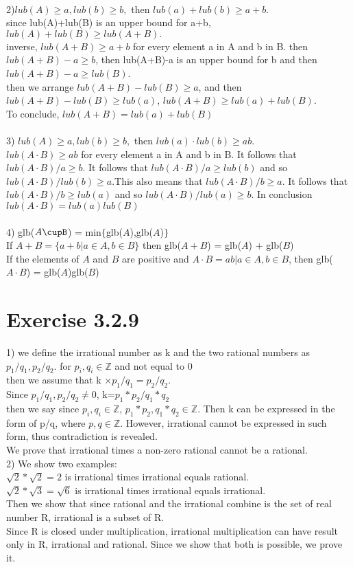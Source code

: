 \documentclass[12pt]{article}
\theoremstyle{definition}
\numberwithin{equation}{subsection}
\begin{document}
\\2)$lub(A) \geq a, lub(b)\geq b,$ then $lub(a)+lub(b)\geq a+b.$ 
\\since lub(A)+lub(B) is an upper bound for a+b, $lub(A)+lub(B)\geq lub(A+B).$
\\inverse, $lub(A+B)\geq a+b$ for every element a in A and b in B. then $lub(A+B)-a \geq b$, then lub(A+B)-a is an upper bound for b and then $lub(A+B)-a \geq lub(B)$.
\\then we arrange $lub(A+B)-lub(B) \geq a$, and then $lub(A+B)-lub(B) \geq lub(a)$, $lub(A+B) \geq lub(a)+lub(B)$.
\\To conclude, $lub(A+B)= lub(a)+lub(B)$
\\
\\3) $lub(A) \geq a, lub(b)\geq b,$ then $lub(a)\cdot lub(b)\geq ab$.
\\ $lub(A \cdot B) \geq ab$ for every element a in A and b in B. It follows that $lub(A \cdot B)/a \geq b$. It follows that $lub(A \cdot B)/a \geq lub(b)$ and so $lub(A \cdot B)/lub(b) \geq a$.This also means that $lub(A \cdot B)/b \geq a$. It follows that $lub(A \cdot B)/b \geq lub(a)$ and so $lub(A \cdot B)/lub(a) \geq b$. In conclusion $lub(A \cdot B)= lub(a)lub(B)$
\\
\\4) glb($A\cupB$) = min$\{$glb($A$),glb($A$)$\}$
\\ If $A+B = \{a + b| a \in A, b \in B\}$ then glb($A+B$) = glb($A$) + glb($B$)
\\ If the elements of $A$ and $B$ are positive and $A\cdot B = {ab | a \in A, b \in B}$, then glb($A \cdot B$) = glb($A$)glb($B$)

\section{Exercise 3.2.9}
1) we define the irrational number as k and the two rational numbers as $p_1/q_1, p_2/q_2$. for $p_i,q_i\in {\mathbb Z}$ and not equal to 0 
\\ then we assume that k $\times p_1/q_1=p_2/q_2$.
\\Since $p_1/q_1, p_2/q_2\neq 0$, k=$p_1*p_2/q_1*q_2$
\\then we say since $p_i,q_i\in {\mathbb Z}$, $p_1*p_2,  q_1*q_2\in {\mathbb Z}$. Then k can be expressed in the form of p/q, where $p,q\in {\mathbb Z}$. However, irrational cannot be expressed in such form, thus contradiction is revealed. 
\\We prove that irrational times a non-zero rational cannot be a rational.
\\
2) We show two examples:
\\ $\sqrt{2}*\sqrt{2}=2$ is irrational times irrational equals rational.
\\ $\sqrt{2}*\sqrt{3}=\sqrt{6}$ is irrational  times irrational equals irrational.
\\Then we show that since rational and the irrational combine is the set of real number R, irrational is a subset of R. 
\\Since R is closed under multiplication, irrational multiplication can have result only in R, irrational and rational. Since we show that both is possible, we prove it.
\end{document}
